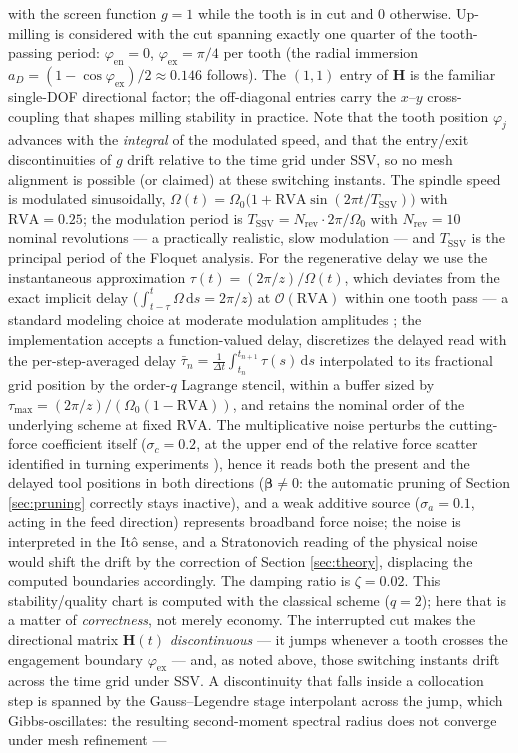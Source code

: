 \documentclass[preprint,12pt]{elsarticle}
\begin{document}
with the screen function $g = 1$ while the tooth is in cut and $0$ otherwise. Up-milling is considered with the cut spanning exactly one quarter of the tooth-passing period: $\varphi_{\mathrm{en}} = 0$, $\varphi_{\mathrm{ex}} = \pi/4$ per tooth (the radial immersion $a_D = (1-\cos\varphi_{\mathrm{ex}})/2 \approx 0.146$ follows). The $(1,1)$ entry of $\mathbf{H}$ is the familiar single-DOF directional factor; the off-diagonal entries carry the $x$--$y$ cross-coupling that shapes milling stability in practice. Note that the tooth position $\varphi_j$ advances with the \emph{integral} of the modulated speed, and that the entry/exit discontinuities of $g$ drift relative to the time grid under SSV, so no mesh alignment is possible (or claimed) at these switching instants. The spindle speed is modulated sinusoidally, $\Omega(t) = \Omega_0\big(1 + \mathrm{RVA}\sin(2\pi t/T_{\mathrm{SSV}})\big)$ with $\mathrm{RVA} = 0.25$; the modulation period is $T_{\mathrm{SSV}} = N_{\mathrm{rev}} \cdot 2\pi/\Omega_0$ with $N_{\mathrm{rev}} = 10$ nominal revolutions --- a practically realistic, slow modulation --- and $T_{\mathrm{SSV}}$ is the principal period of the Floquet analysis. For the regenerative delay we use the instantaneous approximation $\tau(t) = (2\pi/z)/\Omega(t)$, which deviates from the exact implicit delay ($\int_{t-\tau}^{t}\Omega\,\mathrm{d}s = 2\pi/z$) at $\mathcal{O}(\mathrm{RVA})$ within one tooth pass --- a standard modeling choice at moderate modulation amplitudes \cite{Long2007, Seguy2010}; the implementation accepts a function-valued delay, discretizes the delayed read with the per-step-averaged delay $\bar\tau_n = \frac{1}{\Delta t}\int_{t_n}^{t_{n+1}}\tau(s)\,\mathrm{d}s$ interpolated to its fractional grid position by the order-$q$ Lagrange stencil, within a buffer sized by $\tau_{\max} = (2\pi/z)/(\Omega_0(1-\mathrm{RVA}))$, and retains the nominal order of the underlying scheme at fixed $\mathrm{RVA}$. The multiplicative noise perturbs the cutting-force coefficient itself ($\sigma_c = 0.2$, at the upper end of the relative force scatter identified in turning experiments \cite{Fodor2020, Fodor2024_PSD}), hence it reads both the present and the delayed tool positions in both directions ($\boldsymbol\beta \ne 0$: the automatic pruning of Section \ref{sec:pruning} correctly stays inactive), and a weak additive source ($\sigma_a = 0.1$, acting in the feed direction) represents broadband force noise; the noise is interpreted in the It\^o sense, and a Stratonovich reading of the physical noise would shift the drift by the correction of Section \ref{sec:theory}, displacing the computed boundaries accordingly. The damping ratio is $\zeta = 0.02$. This stability/quality chart is computed with the classical scheme ($q = 2$); here that is a matter of \emph{correctness}, not merely economy. The interrupted cut makes the directional matrix $\mathbf{H}(t)$ \emph{discontinuous} --- it jumps whenever a tooth crosses the engagement boundary $\varphi_{\mathrm{ex}}$ --- and, as noted above, those switching instants drift across the time grid under SSV. A discontinuity that falls inside a collocation step is spanned by the Gauss--Legendre stage interpolant across the jump, which Gibbs-oscillates: the resulting second-moment spectral radius does not converge under mesh refinement --- 
\end{document}
